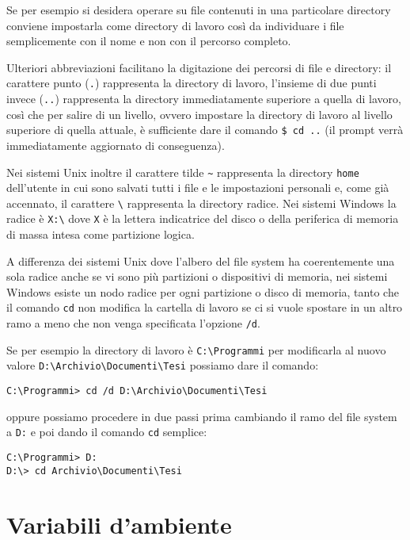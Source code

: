 Se per esempio si desidera operare su file contenuti in una particolare directory conviene impostarla come directory di lavoro così da individuare i file semplicemente con il nome e non con il percorso completo.

Ulteriori abbreviazioni facilitano la digitazione dei percorsi di file e directory: il carattere punto (\texttt{.}) rappresenta la directory di lavoro, l'insieme di due punti invece (\texttt{..}) rappresenta la directory immediatamente superiore a quella di lavoro, così che per salire di un livello, ovvero impostare la directory di lavoro al livello superiore di quella attuale, è sufficiente dare il comando \texttt{\$ cd ..} (il prompt verrà immediatamente aggiornato di conseguenza).

Nei sistemi Unix inoltre il carattere tilde \verb=~= rappresenta la directory \texttt{home} dell'utente in cui sono salvati tutti i file e le impostazioni personali e, come già accennato, il carattere \verb=\= rappresenta la directory radice. Nei sistemi Windows la radice è \texttt{X:\textbackslash} dove \texttt{X} è la lettera indicatrice del disco o della periferica di memoria di massa intesa come partizione logica.

A differenza dei sistemi Unix dove l'albero del file system ha coerentemente una sola radice anche se vi sono più partizioni o dispositivi di memoria, nei sistemi Windows esiste un nodo radice per ogni partizione o disco di memoria, tanto che il comando \texttt{cd} non modifica la cartella di lavoro se ci si vuole spostare in un altro ramo a meno che non venga specificata l'opzione \texttt{/d}.

Se per esempio la directory di lavoro è \verb=C:\Programmi= per modificarla al nuovo valore \verb=D:\Archivio\Documenti\Tesi= possiamo dare il comando:
\begin{verbatim}
C:\Programmi> cd /d D:\Archivio\Documenti\Tesi
\end{verbatim}
oppure possiamo procedere in due passi prima cambiando il ramo del file system a \verb=D:= e poi dando il comando \texttt{cd} semplice:
\begin{verbatim}
C:\Programmi> D:
D:\> cd Archivio\Documenti\Tesi
\end{verbatim}





\section{Variabili d'ambiente}

